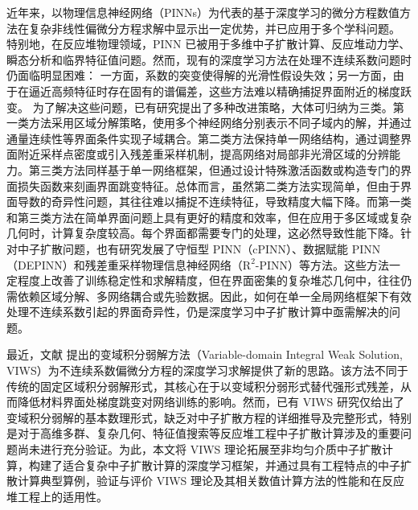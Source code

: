 \documentclass[final,3p,times,sort&compress]{elsarticle}
\begin{document}
近年来，以物理信息神经网络（PINNs）\cite{raissi2019physicsinformed}为代表的基于深度学习的微分方程数值方法在复杂非线性偏微分方程求解中显示出一定优势，并已应用于多个学科问题\cite{karniadakis2021physicsinformed,cuomo2022scientific,toscano2025pinns,luo2025physicsinformed}。
特别地，在反应堆物理领域，PINN 已被用于多维中子扩散计算、反应堆动力学、瞬态分析和临界特征值问题\cite{elhareef2021physicsinformed,xie2021neural,LiuDong2022JiYupinnShen,schiassi2022physicsinformed,prantikos2023physicsinformed,liu2024deep,lee2026development,zeng2026application}。然而，现有的深度学习方法在处理不连续系数问题时仍面临明显困难：
一方面，系数的突变使得解的光滑性假设失效；另一方面，由于在逼近高频特征时存在固有的谱偏差，这些方法难以精确捕捉界面附近的梯度跃变\cite{haghighat2021physicsinformed,lu2021deepxde}。
{\color{black}
为了解决这些问题，已有研究提出了多种改进策略，大体可归纳为三类。第一类方法采用区域分解策略，使用多个神经网络分别表示不同子域内的解，并通过通量连续性等界面条件实现子域耦合\cite{jagtap2020conservative, d.jagtap2020extended,li2020deep,he2022meshfree,wu2022inn,mistani2023jaxdips}。第二类方法保持单一网络结构，通过调整界面附近采样点密度或引入残差重采样机制，提高网络对局部非光滑区域的分辨能力\cite{xie2022weighted,xie2021neural}。第三类方法同样基于单一网络框架，但通过设计特殊激活函数\cite{sarma2024interface,roy2025adaptive}或构造专门的界面损失函数\cite{yao2023deep,tseng2023cuspcapturing,li2025continuitypreserved,li2025two}来刻画界面跳变特征。总体而言，虽然第二类方法实现简单，但由于界面导数的奇异性问题，其往往难以捕捉不连续特征，导致精度大幅下降。而第一类和第三类方法在简单界面问题上具有更好的精度和效率，但在应用于多区域或复杂几何时，计算复杂度较高。每个界面都需要专门的处理，这必然导致性能下降。针对中子扩散问题，也有研究发展了守恒型 PINN（cPINN）、数据赋能 PINN（DEPINN）和残差重采样物理信息神经网络（$\mathrm{R}^2$-PINN）等方法\cite{wang2022surrogate,yang2023physicsconstrained,yang2023dataenabled,yang2024uncertainty,heng2026residual}。这些方法一定程度上改善了训练稳定性和求解精度，但在界面密集的复杂堆芯几何中，往往仍需依赖区域分解、多网络耦合或先验数据。因此，如何在单一全局网络框架下有效处理不连续系数引起的界面奇异性，仍是深度学习中子扩散计算中亟需解决的问题\cite{xie2024physicsspecialized,liu2024discontinuity}。}

{\color{black} 最近，文献 \cite{LiuDong2025MianXiangShen} 提出的变域积分弱解方法（Variable-domain Integral Weak Solution, VIWS）为不连续系数偏微分方程的深度学习求解提供了新的思路。该方法不同于传统的固定区域积分弱解形式，其核心在于以变域积分弱形式替代强形式残差，从而降低材料界面处梯度跳变对网络训练的影响。然而，已有 VIWS 研究仅给出了变域积分弱解的基本数理形式\cite{LiuDong2025MianXiangShen, LiuDong2026MianXiangShen}，缺乏对中子扩散方程的详细推导及完整形式，特别是对于高维多群、复杂几何、特征值搜索等反应堆工程中子扩散计算涉及的重要问题尚未进行充分验证。为此，本文将 VIWS 理论拓展至非均匀介质中子扩散计算，构建了适合复杂中子扩散计算的深度学习框架，并通过具有工程特点的中子扩散计算典型算例，验证与评价 VIWS 理论及其相关数值计算方法的性能和在反应堆工程上的适用性。}
\end{document}
